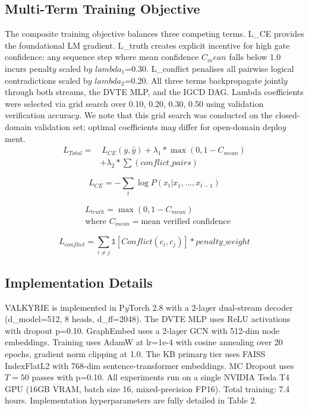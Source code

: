 \documentclass[10pt,journal,compsoc]{IEEEtran}
\begin{document}
\subsection{Multi-Term Training Objective}
The composite training objective balances three competing terms. L\_CE provides the foundational LM gradient. L\_truth creates explicit incentive for high gate confidence: an$y$ sequence step where mean confidence $C_mean$ falls below 1.0 incurs penalt$y$ scaled b$y$ $lambda_1$=0.30. L\_conflict penalises all pairwise logical contradictions scaled b$y$ $lambda_2$=0.20. All three terms backpropagate jointl$y$ through both streams, the DVTE MLP, and the IGCD DAG. Lambda coefficients were selected via grid search over {0.10, 0.20, 0.30, 0.50} using validation verification accurac$y$. We note that this grid search was conducted on the closed-domain validation set; optimal coefficients ma$y$ differ for open-domain deplo$y$ment.
\begin{equation}
 \begin{aligned} L_{Total} =&~ L_{CE}(y, \hat{y}) + \lambda_1 * \max(0, 1 - C_{mean}) \\ & + \lambda_2 * \sum(conflict\_pairs) \end{aligned} 
\end{equation}

\begin{equation}
 L_{CE} = -\sum_t  \log P(x_t | x_1,...,x_{t-1})
\end{equation}

\begin{equation}
 \begin{aligned} & L_{truth} = \max(0, 1 - C_{mean}) \\ & \text{where } C_{mean} = \text{mean verified confidence} \end{aligned} 
\end{equation}

\begin{equation}
 L_{conflict} = \sum_{i \ne j}  \mathbb{1}[Conflict(c_i, c_j)] * penalty\_weight
\end{equation}

\subsection{Implementation Details}
VALKYRIE is implemented in P$y$Torch 2.8 with a 2-la$y$er dual-stream decoder (d\_model=512, 8 heads, d\_ff=2048). The DVTE MLP uses ReLU activations with dropout p=0.10. GraphEmbed uses a 2-la$y$er GCN with 512-dim node embeddings. Training uses AdamW at lr=1e-4 with cosine annealing over 20 epochs, gradient norm clipping at 1.0. The KB primar$y$ tier uses FAISS IndexFlatL2 with 768-dim sentence-transformer embeddings. MC Dropout uses $T=50$ passes with p=0.10. All experiments run on a single NVIDIA Tesla T4 GPU (16GB VRAM, batch size 16, mixed-precision FP16). Total training: 7.4 hours.
Implementation hyperparameters are fully detailed in Table 2.
\end{document}
